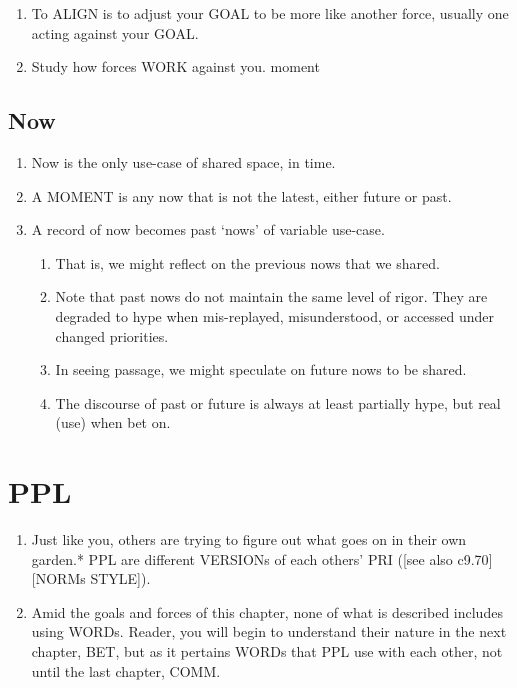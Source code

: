 \documentclass[
]{book}
\providecommand{\tightlist}{%
  \setlength{\itemsep}{0pt}\setlength{\parskip}{0pt}}
\begin{document}
\begin{enumerate}
  \begin{enumerate}
  \def\labelenumii{\arabic{enumii}.}
  \tightlist
  \item
    To ALIGN is to adjust your GOAL to be more like another force, usually one acting against your GOAL.
  \item
    Study how forces WORK against you.
    moment
  \end{enumerate}
\end{enumerate}

\hypertarget{now}{%
\section{Now}\label{now}}

\begin{enumerate}
\def\labelenumi{\arabic{enumi}.}
\setcounter{enumi}{46}
\tightlist
\item
  Now is the only use-case of shared space, in time.
\item
  A MOMENT is any now that is not the latest, either future or past.
\item
  A record of now becomes past `nows' of variable use-case.

  \begin{enumerate}
  \def\labelenumii{\arabic{enumii}.}
  \tightlist
  \item
    That is, we might reflect on the previous nows that we shared.
  \item
    Note that past nows do not maintain the same level of rigor. They are degraded to hype when mis-replayed, misunderstood, or accessed under changed priorities.
  \item
    In seeing passage, we might speculate on future nows to be shared.
  \item
    The discourse of past or future is always at least partially hype, but real (use) when bet on.
  \end{enumerate}
\end{enumerate}

\hypertarget{ppl}{%
\chapter{PPL}\label{ppl}}

\begin{enumerate}
\def\labelenumi{\arabic{enumi}.}
\item
  Just like you, others are trying to figure out what goes on in their own garden.* PPL are different VERSIONs of each others' PRI ({[}see also c9.70{]}{[}NORMs STYLE{]}).
\item
  Amid the goals and forces of this chapter, none of what is described includes using WORDs. Reader, you will begin to understand their nature in the next chapter, BET, but as it pertains WORDs that PPL use with each other, not until the last chapter, COMM.
\end{enumerate}
\end{document}

